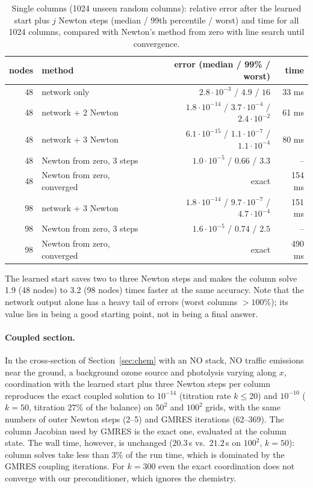 \documentclass[11pt]{article}
\begin{document}
\begin{table}[t]
\centering
\caption{Single columns (1024 unseen random columns): relative error after the learned start plus $j$ Newton
steps (median / 99th percentile / worst) and time for all 1024 columns, compared with Newton's method from
zero with line search until convergence.}
\label{tab:multi}
\begin{tabular}{rlrr}
\toprule
nodes & method & error (median / 99\% / worst) & time\\
\midrule
48 & network only & $2.8\cdot10^{-3}$ / $4.9$ / $16$ & 33 ms\\
48 & network + 2 Newton & $1.8\cdot10^{-14}$ / $3.7\cdot10^{-4}$ / $2.4\cdot10^{-2}$ & 61 ms\\
48 & network + 3 Newton & $6.1\cdot10^{-15}$ / $1.1\cdot10^{-7}$ / $1.1\cdot10^{-4}$ & 80 ms\\
48 & Newton from zero, 3 steps & $1.0\cdot10^{-5}$ / $0.66$ / $3.3$ & --\\
48 & Newton from zero, converged & exact & 154 ms\\
\midrule
98 & network + 3 Newton & $1.8\cdot10^{-14}$ / $9.7\cdot10^{-7}$ / $4.7\cdot10^{-4}$ & 151 ms\\
98 & Newton from zero, 3 steps & $1.6\cdot10^{-5}$ / $0.74$ / $2.5$ & --\\
98 & Newton from zero, converged & exact & 490 ms\\
\bottomrule
\end{tabular}
\end{table}

The learned start saves two to three Newton steps and makes the column solve 1.9 (48 nodes) to 3.2 (98 nodes)
times faster at the same accuracy. Note that the network output alone has a heavy tail of errors (worst
columns $>100\%$); its value lies in being a good starting point, not in being a final answer.

\paragraph{Coupled section.}
In the cross-section of Section~\ref{sec:chem} with an NO stack, NO traffic emissions near the ground,
a background ozone source and photolysis varying along $x$, coordination with the learned start plus three
Newton steps per column reproduces the exact coupled solution to $10^{-14}$ (titration rate $k\le20$) and
$10^{-10}$ ($k=50$, titration $27\%$ of the balance) on $50^2$ and $100^2$ grids, with the same numbers of outer
Newton steps (2--5) and GMRES iterations (62--369). The column Jacobian used by GMRES is the exact one,
evaluated at the column state. The wall time, however, is unchanged ($20.3$\,s vs.\ $21.2$\,s on $100^2$,
$k=50$): column solves take less than $3\%$ of the run time, which is dominated by the GMRES coupling
iterations. For $k=300$ even the exact coordination does not converge with our preconditioner, which ignores
the chemistry.
\end{document}
